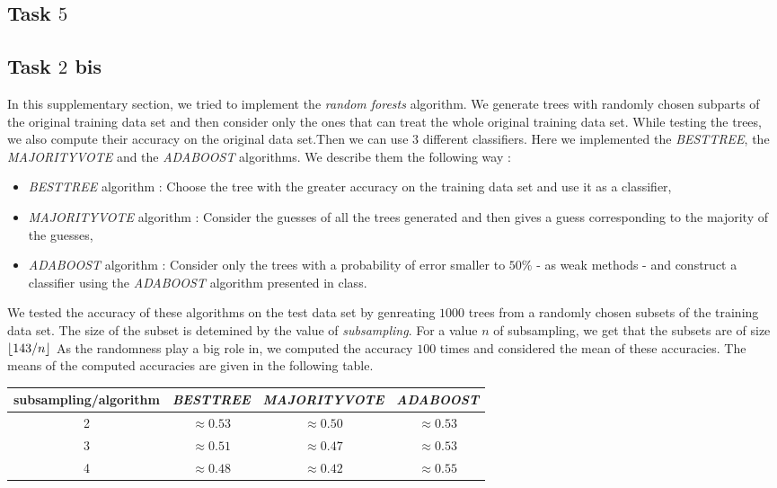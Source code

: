 \documentclass[french]{article}
\DeclarePairedDelimiter\floor{\lfloor}{\rfloor}
\begin{document}
\subsection{Task $5$}

\subsection{Task $2$ bis}
	In this supplementary section, we tried to implement the \emph{random forests} algorithm. We generate trees with randomly chosen subparts of the original training data set and then consider only the ones that can treat the whole original training data set. While testing the trees, we also compute their accuracy on the original data set.Then we can use $3$ different classifiers. Here we implemented the \emph{BESTTREE}, the \emph{MAJORITYVOTE} and the \emph{ADABOOST} algorithms. We describe them the following way :
	\begin{itemize}
		\item \emph{BESTTREE} algorithm : Choose the tree with the greater accuracy on the training data set and use it as a classifier,
		\item \emph{MAJORITYVOTE} algorithm : Consider the guesses of all the trees generated and then gives a guess corresponding to the majority of the guesses,
		\item \emph{ADABOOST} algorithm : Consider only the trees with a probability of error smaller to $50\%$  - as weak methods - and construct a classifier using the \emph{ADABOOST} algorithm presented in class.
	\end{itemize}
	We tested the accuracy of these algorithms on the test data set by genreating $1000$ trees from a randomly chosen subsets of the training data set. The size of the subset is detemined by the value of \emph{subsampling}. For a value $n$ of subsampling, we get that the subsets are of size $\floor{143/n}$ As the randomness play a big role in, we computed the accuracy $100$ times and considered the mean of these accuracies. The means of the computed accuracies are given in the following table.
	\begin{center}
		\begin{tabular}{ |c|c|c|c| }
			\hline
			subsampling/algorithm& \emph{BESTTREE} & \emph{MAJORITYVOTE} & \emph{ADABOOST}\\
			\hline
			2 & $\approx 0.53$  & $\approx 0.50$ & $\approx 0.53$ \\
			\hline
			3 & $\approx 0.51 $ & $\approx 0.47$ & $\approx 0.53$ \\
			\hline
			4 & $\approx 0.48$ & $\approx 0.42$ & $\approx 0.55$\\
			\hline
		\end{tabular}
	\end{center}
\end{document}

